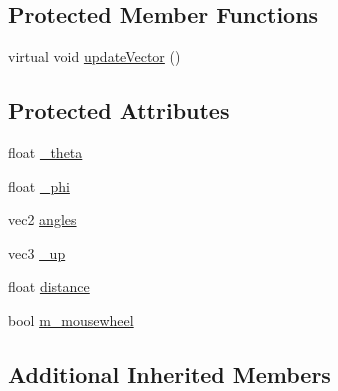 \subsection*{Protected Member Functions}
\begin{DoxyCompactItemize}
\item 
virtual void \hyperlink{class_agmd_1_1_follow_camera_a7333f2458e8545bc9958e6fbb7013f62}{update\+Vector} ()
\end{DoxyCompactItemize}
\subsection*{Protected Attributes}
\begin{DoxyCompactItemize}
\item 
float \hyperlink{class_agmd_1_1_follow_camera_a623b04727c0d3715f70322e96aeddb16}{\+\_\+theta}
\item 
float \hyperlink{class_agmd_1_1_follow_camera_a3360193bd8bde21673e3fd9ca3e6e87b}{\+\_\+phi}
\item 
vec2 \hyperlink{class_agmd_1_1_follow_camera_a1ef61747e3224e219edfa092cb0c4255}{angles}
\item 
vec3 \hyperlink{class_agmd_1_1_follow_camera_a24b4a832df24a6757d7e356135de2bd4}{\+\_\+up}
\item 
float \hyperlink{class_agmd_1_1_follow_camera_ab53685827a4fc37078210e80b174e3b7}{distance}
\item 
bool \hyperlink{class_agmd_1_1_follow_camera_a3c50e74860b0dd029b6a9dad0fd9a3ff}{m\+\_\+mousewheel}
\end{DoxyCompactItemize}
\subsection*{Additional Inherited Members}


